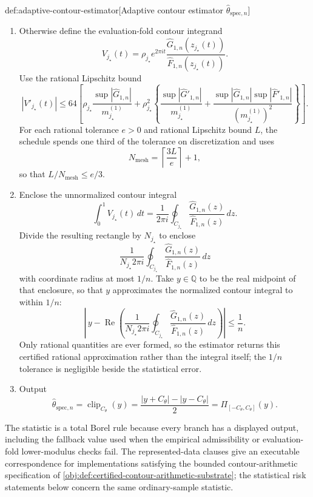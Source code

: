 \documentclass[11pt]{article}
\begin{document}
\begin{algorithmv}{def:adaptive-contour-estimator}[Adaptive contour estimator \(\widehat\theta_{\mathrm{spec},n}\)]
\begin{enumerate}
\item Otherwise define the evaluation-fold contour integrand
\[
V_{j_{\star}}(t)=
\rho_{j_{\star}}e^{2\pi it}
\frac{\widehat G_{1,n}(z_{j_{\star}}(t))}
{\widehat F_{1,n}(z_{j_{\star}}(t))}.
\]
Use the rational Lipschitz bound
\[
|V'_{j_{\star}}(t)|\le
64\left[
\rho_{j_{\star}}\frac{\sup|\widehat G_{1,n}|}{m_{j_{\star}}^{(1)}}
+\rho_{j_{\star}}^2\left\{
\frac{\sup|\widehat G'_{1,n}|}{m_{j_{\star}}^{(1)}}
+\frac{\sup|\widehat G_{1,n}|\sup|\widehat F'_{1,n}|}{(m_{j_{\star}}^{(1)})^2}
\right\}\right].
\]
For each rational tolerance \(e>0\) and rational Lipschitz bound \(L\), the schedule spends one third of the tolerance on discretization and uses
\[
N_{\mathrm{mesh}}=\left\lceil\frac{3L}{e}\right\rceil+1,
\]
so that \(L/N_{\mathrm{mesh}}\le e/3\).

\item Enclose the unnormalized contour integral
\[
\int_0^1V_{j_{\star}}(t)\,dt
=
\frac{1}{2\pi i}\oint_{C_{j_{\star}}}
\frac{\widehat G_{1,n}(z)}
{\widehat F_{1,n}(z)}\,dz.
\]
Divide the resulting rectangle by \(N_{j_{\star}}\) to enclose
\[
\frac{1}{N_{j_{\star}}2\pi i}
\oint_{C_{j_{\star}}}
\frac{\widehat G_{1,n}(z)}
{\widehat F_{1,n}(z)}\,dz
\]
with coordinate radius at most \(1/n\). Take \(y\in\mathbb Q\) to be the real midpoint of that enclosure, so that \(y\) approximates the normalized contour integral to within \(1/n\):
\[
\left|\,y-\operatorname{Re}\left(\frac{1}{N_{j_{\star}}2\pi i}
\oint_{C_{j_{\star}}}\frac{\widehat G_{1,n}(z)}{\widehat F_{1,n}(z)}\,dz\right)\right|\le\frac1n.
\]
Only rational quantities are ever formed, so the estimator returns this certified rational approximation rather than the integral itself; the \(1/n\) tolerance is negligible beside the statistical error.

\item Output
\[
\widehat\theta_{\mathrm{spec},n}
=
\operatorname{clip}_{C_{\theta}}(y)
=
\frac{|y+C_{\theta}|-|y-C_{\theta}|}{2}
=
\Pi_{[-C_{\theta},C_{\theta}]}(y).
\]
\end{enumerate}
\end{algorithmv}

The statistic  is a total Borel rule because every branch has a displayed output, including the fallback value used when the empirical admissibility or evaluation-fold lower-modulus checks fail. The represented-data clauses give an executable correspondence for implementations satisfying the bounded contour-arithmetic specification of \cref{obj:def:certified-contour-arithmetic-substrate}; the statistical risk statements below concern the same ordinary-sample statistic.
\end{document}
